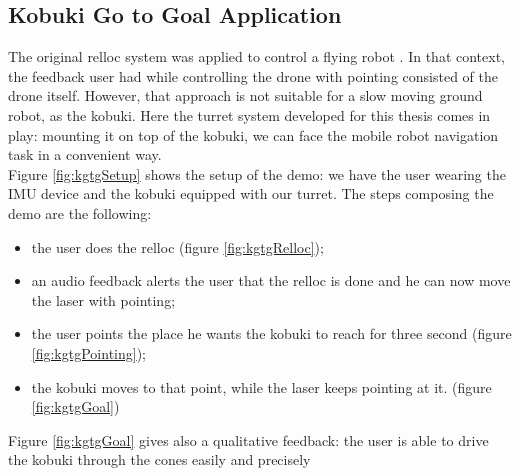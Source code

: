 \subsection{Kobuki Go to Goal Application}
The original relloc system was applied to control a flying robot \cite{gromov2018robot}. In that context, the feedback user had while controlling the drone with pointing consisted of the drone itself. However, that approach is not suitable for a slow moving ground robot, as the kobuki. Here the turret system developed for this thesis comes in play: mounting it on top of the kobuki, we can face the mobile robot navigation task in a convenient way.\\
Figure \ref{fig:kgtgSetup} shows the setup of the demo: we have the user wearing the IMU device and the kobuki equipped with our turret. The steps composing the demo are the following:
\begin{itemize}
    \item the user does the relloc (figure \ref{fig:kgtgRelloc});
    \item an audio feedback alerts the user that the relloc is done and he can now move the laser with pointing;
    \item the user points the place he wants the kobuki to reach for three second (figure \ref{fig:kgtgPointing});
    \item the kobuki moves to that point, while the laser keeps pointing at it. (figure \ref{fig:kgtgGoal})
\end{itemize}
Figure \ref{fig:kgtgGoal} gives also a qualitative feedback: the user is able to drive the kobuki through the cones easily and precisely



